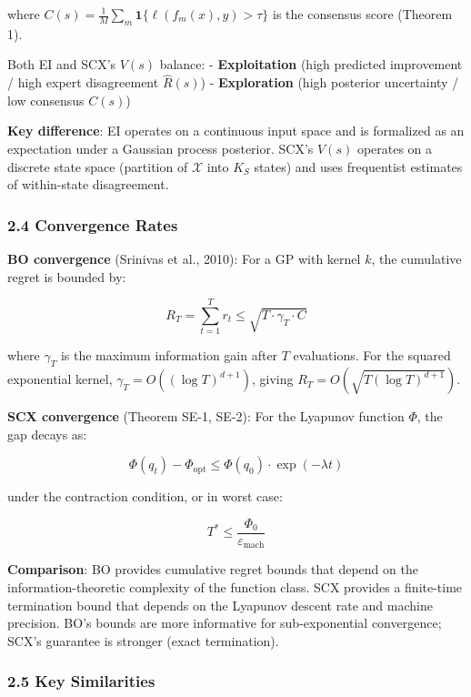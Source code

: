 \documentclass[
  12pt,
]{ctexart}
\begin{document}
where \(C(s) = \frac{1}{M}\sum_m \mathbf{1}\{\ell(f_m(x), y) > \tau\}\)
is the consensus score (Theorem 1).

Both EI and SCX's \(V(s)\) balance: - \textbf{Exploitation} (high
predicted improvement / high expert disagreement \(\hat{R}(s)\)) -
\textbf{Exploration} (high posterior uncertainty / low consensus
\(C(s)\))

\textbf{Key difference}: EI operates on a continuous input space and is
formalized as an expectation under a Gaussian process posterior. SCX's
\(V(s)\) operates on a discrete state space (partition of
\(\mathcal{X}\) into \(K_S\) states) and uses frequentist estimates of
within-state disagreement.

\subsubsection{2.4 Convergence Rates}\label{convergence-rates}

\textbf{BO convergence} (Srinivas et al., 2010): For a GP with kernel
\(k\), the cumulative regret is bounded by:

\[R_T = \sum_{t=1}^T r_t \leq \sqrt{T \cdot \gamma_T \cdot C}\]

where \(\gamma_T\) is the maximum information gain after \(T\)
evaluations. For the squared exponential kernel,
\(\gamma_T = O((\log T)^{d+1})\), giving
\(R_T = O(\sqrt{T (\log T)^{d+1}})\).

\textbf{SCX convergence} (Theorem SE-1, SE-2): For the Lyapunov function
\(\Phi\), the gap decays as:

\[\Phi(q_t) - \Phi_{\text{opt}} \leq \Phi(q_0) \cdot \exp(-\lambda t)\]

under the contraction condition, or in worst case:

\[T^* \leq \frac{\Phi_0}{\varepsilon_{\text{mach}}}\]

\textbf{Comparison}: BO provides cumulative regret bounds that depend on
the information-theoretic complexity of the function class. SCX provides
a finite-time termination bound that depends on the Lyapunov descent
rate and machine precision. BO's bounds are more informative for
sub-exponential convergence; SCX's guarantee is stronger (exact
termination).

\subsubsection{2.5 Key Similarities}\label{key-similarities-1}
\end{document}

